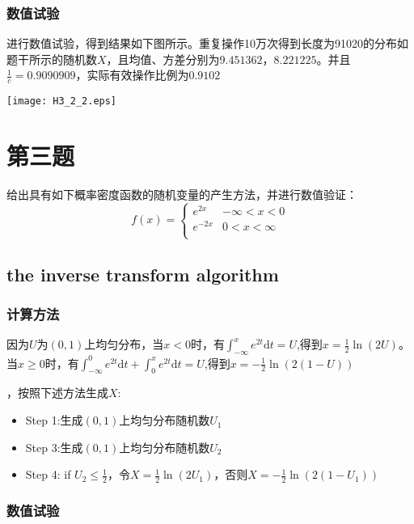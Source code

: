 \documentclass{ctexart}
\begin{document}
\subsubsection{数值试验}

进行数值试验，得到结果如下图所示。重复操作10万次得到长度为91020的分布如题干所示的随机数\(X\)，且均值、方差分别为\(9.451362，8.221225\)。并且\(\frac{1}{c}=0.9090909\)，实际有效操作比例为\(0.9102\)

\centerline{\texttt{[image: H3\_2\_2.eps]}}




\section{第三题}  

给出具有如下概率密度函数的随机变量的产生方法，并进行数值验证：
 \[
f(x)= \left\{ \begin{array}{rl}
  e^{2x} & -\infty < x< 0\\
  e^{-2x} & 0<x<\infty \\
     \end{array} \right.
\]

\subsection{the inverse transform algorithm}
 \subsubsection{计算方法}
因为\(U\)为\((0,1)\)上均匀分布，当\(x<0\)时，有\(\int_{-\infty}^x e^{2t} \mbox{d} t =U\),得到\(x=\frac{1}{2} \ln (2U)\)。当\(x
\geq 0\)时，有\(\int_{-\infty}^0 e^{2t} \mbox{d} t +\int_0^x e^{2t} \mbox{d}t=U\),得到\(x=-\frac{1}{2} \ln (2(1-U))\)


，按照下述方法生成\(X\):

\begin{itemize} 
\item Step 1:生成\((0,1)\)上均匀分布随机数\(U_1\) 
\item Step 3:生成\((0,1)\)上均匀分布随机数\(U_2\) 
\item Step 4: if \(U_2 \leq \frac{1}{2}\)，令\(X=\frac{1}{2} \ln (2U_1)\)，否则\(X=-\frac{1}{2} \ln (2(1-U_1))\)
\end{itemize}

\subsubsection{数值试验}
\end{document}

